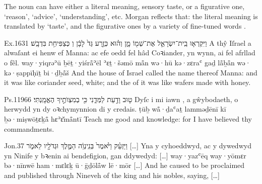
\begin{paper}
	The noun  can have either a literal meaning, sensory taste, or a figurative one, ‘reason’, ‘advice’, ‘understanding’, etc. Morgan reflects that: the literal meaning is translated by  ‘taste’, and the figurative ones by a variety of fine-tuned words .
\end{paper}

\begin{example}{Ex.}{16}{31}{}{}
	\quoling
	{וַיִּקְרְא֧וּ בֵֽית־יִשְׂרָאֵ֛ל אֶת־שְׁמ֖וֹ מָ֑ן וְה֗וּא כְּזֶ֤רַע גַּד֙ לָבָ֔ן וְ כְּצַפִּיחִ֥ת בִּדְבָֽשׁ׃}
	{A thŷ Iſrael a alwaſant ei henw ef Manna: ac efe oedd fel hâd Coꝛiander, yn wynn, ai  fel afrllad o fêl.}
	{way·yiqrəʾū ḇēṯ·yiśrå̄ʾēl ʾɛṯ·šəmō må̄n wə·hū kə·zɛraʿ gaḏ lå̄ḇå̄n wə· kə·ṣappīḥīṯ bi·ḏḇå̄š}
	{And the house of Israel called the name thereof Manna: and it was like coriander seed, white; and the  of it was like wafers made with honey.}
\end{example}

\begin{example}{Ps.}{119}{66}{}{}
	\quoling
	{ט֤וּב  וָדַ֣עַת לַמְּדֵ֑נִי כִּ֖י בְמִצְוֺתֶ֣יךָ הֶאֱמָֽנְתִּי׃}
	{Dyſc i mi iawn , a gŵybodaeth, o herwydd yn dy oꝛchymynnion di y credais.}
	{ṭūḇ  wå̄·ḏaʿaṯ lamməḏēnī kī ḇə·miṣwōṯɛḵå̄ hɛʾɛ̆må̄ntī}
	{Teach me good  and knowledge: for I have believed thy commandments.}
\end{example}


\begin{example}{Jon.}{3}{7}{}{}
	\quoling
	{וַיַּזְעֵ֗ק וַיֹּ֙אמֶר֙ בְּנִֽינְוֵ֔ה  הַמֶּ֛לֶךְ וּגְדֹלָ֖יו לֵאמֹ֑ר […]}
	{Yna y cyhoeddwyd, ac y dywedwyd yn Ninife  y bꝛenin ai bendefigion, gan ddywedyd: […]}
	{way·yazʿēq way·yōmɛr bə·nīnwē  ham·mɛlɛḵ ū·ḡḏōlå̄w lē·mōr […]}
	{And he caused  to be proclaimed and published through Nineveh  of the king and his nobles, saying, […]}
\end{example}



